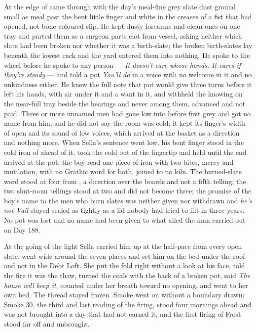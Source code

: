 At the edge of   came through with the day's meal-fine grey slate dust ground small as meal past the bent little finger and white in the creases of a fist that had opened, not bone-coloured slip. He kept dusty forearms and clean ones on one tray and parted them as a surgeon parts clot from vessel, asking neither which slate had been broken nor whether it was a birth-slate; the broken birth-slates lay beneath the lowest rack and the yard entered them into nothing. He spoke to the wheel before he spoke to any person --- \emph{It doesn't care whose hands. It cares if they're steady} --- and told a pot \emph{You'll do} in a voice with no welcome in it and no unkindness either. He knew the full note that pot would give three turns before it left his hands, with air under it and a want in it, and withheld the knowing on the near-full tray beside the hearings and never among them, advanced and not paid. Three or more unnamed men had gone low into  before first grey and got no name from him, and he did not say the room was cold; it kept its finger's width of open and its sound of low voices, which arrived at the basket as a direction and nothing more. When Sella's sentence went low, his bent finger stood in the cold iron of  ahead of it, took the cold out of the fingertip and held until the end arrived at the pot; the boy read one piece of iron with two bites, mercy and mutilation, with no Grathic word for both, joined to no kiln. The burned-slate word stood at four from , a direction over the boards and not a fifth telling; the two shut-room tellings stood at two and did not become three; the promise of the boy's name to the men who burn slates was neither given nor withdrawn and \emph{he's not Vail} stayed sealed as tightly as a lid nobody had tried to lift in three years. No pot was lost and no name had been given to what ailed the man carried out on Day 188.

\scenebreak

At the going of the light Sella carried him up at the half-pace from every open slate, went wide around the seven places and set him on the bed under the roof and not in the Debt Loft. She put the fold right without a look at his face, told the fire it was the thaw, turned the coals with the back of a broken pot, said \emph{The house will keep it}, counted under her breath toward no opening, and went to her own bed. The thread stayed frozen. Smoke went on without a boundary drawn; Smoke 30, the third and last reading of the firing, stood four mornings ahead and was not brought into a day that had not earned it, and the first firing of Frost stood far off and unbrought.

